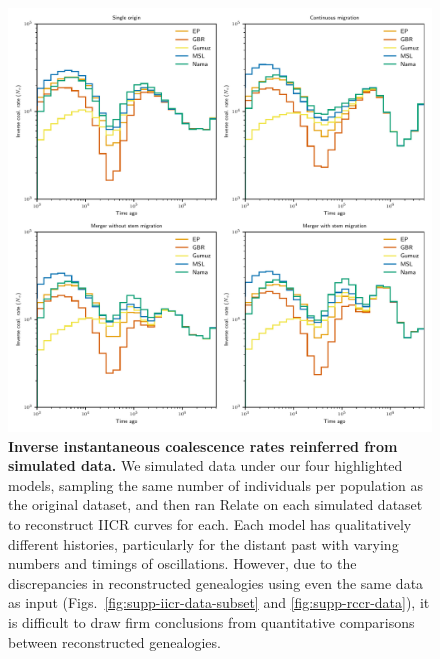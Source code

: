 \documentclass[]{article}
\begin{document}
\begin{figure}[ht]
    \centering
    \includegraphics[width=\textwidth]{figures/supp-relate-iicr-simulation}
    \caption{
        \textbf{Inverse instantaneous coalescence rates reinferred from
        simulated data.} We simulated data under our four highlighted models,
        sampling the same number of individuals per population as the original
        dataset, and then ran Relate on each simulated dataset to reconstruct
        IICR curves for each. Each model has qualitatively different histories,
        particularly for the distant past with varying numbers and timings of
        oscillations. However, due to the discrepancies in reconstructed
        genealogies using even the same data as input
        (Figs.~\ref{fig:supp-iicr-data-subset} and \ref{fig:supp-rccr-data}),
        it is difficult to draw firm conclusions from quantitative comparisons
        between reconstructed genealogies.
    }
    \label{fig:supp-iicr-sim}
\end{figure}
\end{document}
